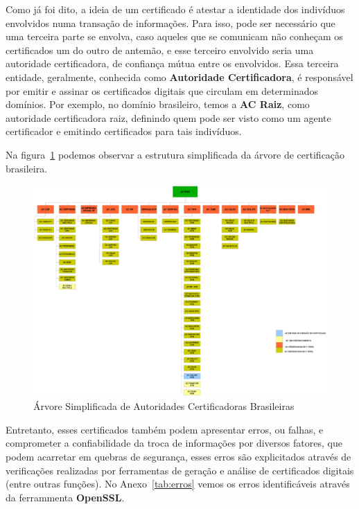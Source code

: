 	Como já foi dito, a ideia de um certificado é atestar a identidade dos indivíduos envolvidos numa transação de informações. Para isso, pode ser necessário que uma terceira parte se envolva, caso aqueles que se comunicam não conheçam os certificados um do outro de antemão, e esse terceiro envolvido seria uma autoridade certificadora, de confiança mútua entre os envolvidos. Essa terceira entidade, geralmente, conhecida como \textbf{Autoridade Certificadora}, é responsável por emitir e assinar os certificados digitais que circulam em determinados domínios. Por exemplo, no domínio brasileiro, temos a \textbf{AC Raiz}, como autoridade certificadora raiz, definindo quem pode ser visto como um agente certificador e emitindo certificados para tais indivíduos.

	Na figura~\ref{fig:img08} podemos observar a estrutura simplificada da árvore de certificação brasileira.

	\begin{figure}[!ht]
		\centering
		\includegraphics[keepaspectratio=true,scale=0.7]{figuras/certBR.eps}
		\caption{Árvore Simplificada de Autoridades Certificadoras Brasileiras \cite{itiICPBRASIL}}
		\label{fig:img08}
	\end{figure}

	Entretanto, esses certificados também podem apresentar erros, ou falhas, e comprometer a confiabilidade da troca de informações por diversos fatores, que podem acarretar em quebras de segurança, esses erros são explicitados através de verificações realizadas por ferramentas de geração e análise de certificados digitais (entre outras funções). No Anexo~\ref{tab:erros} vemos os erros identificáveis através da ferrammenta \textbf{OpenSSL}. 

